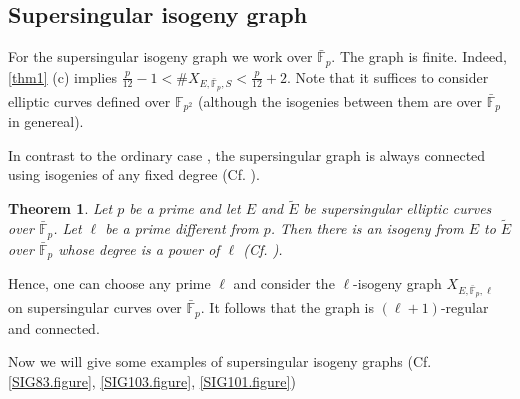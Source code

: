 \documentclass{article}
\theoremstyle{theorem}
\newtheorem{theorem}{Theorem}
\theoremstyle{definition}
\begin{document}
\subsection{Supersingular isogeny graph}

For the supersingular isogeny graph we work over $\bar{\mathbb{F}}_p$. The graph is finite. Indeed, \cref{thm1} (c) implies $\frac{p}{12} - 1 < \#X_{E, \bar{\mathbb{F}}_p, S} < \frac{p}{12} + 2$. Note that it suffices to consider elliptic curves defined over $\mathbb{F}_{p^2}$ (although the isogenies between them are over $\bar{\mathbb{F}}_p$ in genereal).

In contrast to the ordinary case , the supersingular graph is always connected using isogenies of any fixed degree (Cf. \cite[2.4]{Mestre}).

\begin{theorem}
	Let $p$ be a prime and let $E$ and $\tilde{E}$ be supersingular elliptic curves over $\bar{\mathbb{F}}_p$. Let $\ell$ be a prime different from $p$. Then there is an isogeny from $E$ to $\tilde{E}$ over $\bar{\mathbb{F}}_p$ whose degree is a power of $\ell$ (Cf. \cite[2.4]{Mestre}).
\end{theorem}

Hence, one can choose any prime $\ell$ and consider the $\ell$-isogeny graph $X_{E,\bar{\mathbb{F}}_p, {\ell}}$ on supersingular curves over $\bar{\mathbb{F}}_p$. It follows that the graph is $(\ell + 1)$-regular and connected.

Now we will give some examples of supersingular isogeny graphs (Cf. \cref{SIG83.figure}, \cref{SIG103.figure}, \cref{SIG101.figure})
\end{document}
